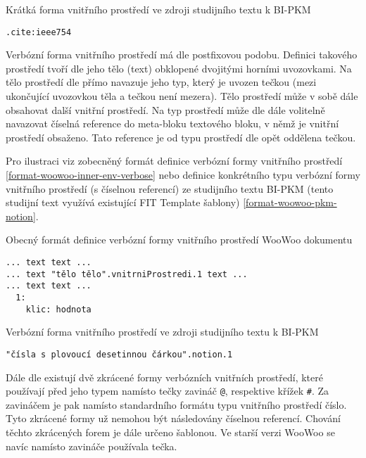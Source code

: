 \begin{listing}
    \caption{Krátká forma vnitřního prostředí ve zdroji studijního textu k BI-PKM \cite{pkm}}
    \label{format-woowoo-pkm-cite}
    \begin{verbatim}
.cite:ieee754
    \end{verbatim}
\end{listing}

Verbózní forma vnitřního prostředí má dle \cite{woowoo} postfixovou podobu. Definici takového prostředí tvoří dle
\cite{woowoo} jeho tělo (text) obklopené dvojitými horními uvozovkami. Na tělo prostředí dle \cite{woowoo} přímo
navazuje jeho typ, který je uvozen tečkou (mezi ukončující uvozovkou těla a tečkou není mezera). Tělo prostředí může
v sobě dále obsahovat další vnitřní prostředí. Na typ prostředí může dle \cite{woowoo} dále volitelně navazovat číselná
reference do meta-bloku textového bloku, v němž je vnitřní prostředí obsaženo. Tato reference je od typu prostředí dle
\cite{woowoo} opět oddělena tečkou.

Pro ilustraci viz zobecněný formát definice verbózní formy vnitřního prostředí \ref{format-woowoo-inner-env-verbose}
nebo definice konkrétního typu verbózní formy vnitřního prostředí (s číselnou referencí) ze studijního textu BI-PKM
(tento studijní text využívá existující FIT Template šablony) \ref{format-woowoo-pkm-notion}.

\begin{listing}
    \caption{Obecný formát definice verbózní formy vnitřního prostředí WooWoo dokumentu}
    \label{format-woowoo-inner-env-verbose}
    \begin{verbatim}
... text text ...
... text "tělo tělo".vnitrniProstredi.1 text ...
... text text ...
  1:
    klic: hodnota
    \end{verbatim}
\end{listing}

\begin{listing}
    \caption{Verbózní forma vnitřního prostředí ve zdroji studijního textu k BI-PKM \cite{pkm}}
    \label{format-woowoo-pkm-notion}
    \begin{verbatim}
"čísla s plovoucí desetinnou čárkou".notion.1
    \end{verbatim}
\end{listing}

Dále dle \cite{woowoo} existují dvě zkrácené formy verbózních vnitřních prostředí, které používají před jeho typem
namísto tečky zavináč \texttt{@}, respektive křížek \texttt{#}. Za zavináčem je pak namísto
standardního formátu typu vnitřního prostředí číslo. Tyto zkrácené formy už nemohou být následovány číselnou
referencí. Chování těchto zkrácených forem je dále určeno šablonou. Ve starší verzi WooWoo se navíc namísto zavináče
používala tečka.

